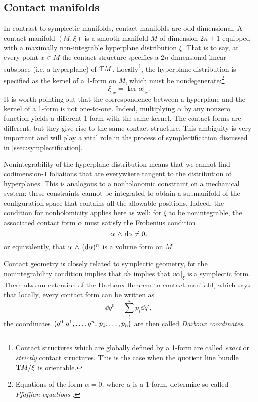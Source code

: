 \subsection{Contact manifolds}
In contrast to symplectic manifolds, contact manifolds are odd-dimensional. A contact manifold \((M, \xi)\) is a smooth manifold \(M\) of dimension \(2n + 1\) equipped with a maximally non-integrable hyperplane distribution \(\xi\). That is to say, at every point \(x \in M\) the contact structure specifies a \(2n\)-dimensional linear subspace (i.e. a hyperplane) of \(\mathrm{T}M\). Locally\footnote
{
    Contact structures which are globally defined by a 1-form are called \emph{exact} or \emph{strictly} contact structures. This is the case when the quotient line bundle \( \mathrm{T}M/\xi\) is orientable. 
}, the hyperplane distribution is specified as the kernel of a 1-form on \(M\), which must be nondegenerate:\footnote{Equations of the form \( \alpha = 0\), where \(\alpha\) is a 1-form, determine so-called \emph{Pfaffian equations} \cite{Libermann1987}.} \cite{Geiges2008, Arnold1989, Cannas2001}
\begin{equation}
     \xi\vert_x = \ker{\alpha}\vert_x.
\end{equation}
It is worth pointing out that the correspondence between a hyperplane and the kernel of a 1-form is not one-to-one. Indeed, multiplying \(\alpha\) by any nonzero function yields a different 1-form with the same kernel. The contact forms are different, but they give rise to the same contact structure. This ambiguity is very important and will play a vital role in the process of symplectification discussed in \cref{ssec:symplectification}.

Nonintegrability of the hyperplane distribution means that we cannot find codimension-1 foliations that are everywhere tangent to the distribution of hyperplanes. This is analogous to a nonholonomic constraint on a mechanical system: these constraints cannot be integrated to obtain a submanifold of the configuration space that contains all the allowable positions. Indeed, the condition for nonholomicity applies here as well: for \(\xi\) to be nonintegrable, the associated contact form \(\alpha\) must satisfy the Frobenius condition 
\begin{equation}
      \alpha\,\wedge\,\dd{\alpha}  \neq 0,
\end{equation}
or equivalently, that \( \alpha\,\wedge\,(\dd{\alpha})^n \) is a volume form on \(M\). 

Contact geometry is closely related to symplectic geometry, for the nonintegrability condition implies that \(\dd{\alpha}\) implies that \(\dd{\alpha}\vert_{\xi}\) is a symplectic form. There also an extension of the Darboux theorem to contact manifold, which says that locally, every contact form can be written as
\begin{equation}
    \dd{q^0} - \sum_i^n p_i \dd{q^i}, 
    \label{eq:contact_darboux}
\end{equation} 
the coordinates \(\qty(q^0, q^1, \ldots, q^n,\, p_1, \ldots, p_n)\) are then called \emph{Darboux coordinates}.

